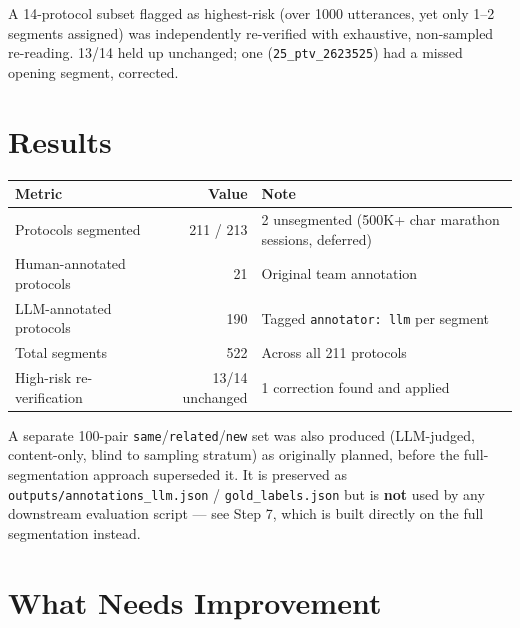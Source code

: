 \documentclass[11pt,a4paper]{article}
\begin{document}
A 14-protocol subset flagged as highest-risk (over 1000 utterances, yet only 1--2 segments
assigned) was independently re-verified with exhaustive, non-sampled re-reading. 13/14 held up
unchanged; one (\texttt{25\_ptv\_2623525}) had a missed opening segment, corrected.

\section{Results}

\begin{center}
\small
\begin{tabular}{lrp{6.5cm}}
\toprule
\textbf{Metric} & \textbf{Value} & \textbf{Note} \\
\midrule
Protocols segmented & 211 / 213 & 2 unsegmented (500K+ char marathon sessions, deferred) \\
Human-annotated protocols & 21 & Original team annotation \\
LLM-annotated protocols & 190 & Tagged \texttt{annotator: llm} per segment \\
Total segments & 522 & Across all 211 protocols \\
High-risk re-verification & 13/14 unchanged & 1 correction found and applied \\
\bottomrule
\end{tabular}
\end{center}

A separate 100-pair \texttt{same}/\texttt{related}/\texttt{new} set was also produced (LLM-judged,
content-only, blind to sampling stratum) as originally planned, before the full-segmentation
approach superseded it. It is preserved as \texttt{outputs/annotations\_llm.json} /
\texttt{gold\_labels.json} but is \textbf{not} used by any downstream evaluation script --- see
Step 7, which is built directly on the full segmentation instead.

\section{What Needs Improvement}
\end{document}
